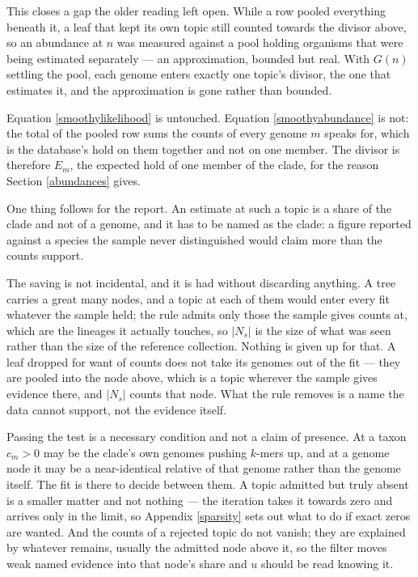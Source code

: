 \documentclass[pdflatex,sn-vancouver-num]{sn-jnl}
\begin{document}
    This closes a gap the older reading left open. While a row pooled everything beneath it, a leaf
    that kept its own topic still counted towards the divisor above, so an abundance at $n$ was
    measured against a pool holding organisms that were being estimated separately --- an
    approximation, bounded but real. With $G(n)$ settling the pool, each genome enters exactly one
    topic's divisor, the one that estimates it, and the approximation is gone rather than
    bounded.

    Equation \eqref{smoothylikelihood} is untouched. Equation \eqref{smoothyabundance} is not:
    the total of the pooled row sums the counts of every genome $m$ speaks for, which
    is the database's hold on them together and not on one member. The divisor is therefore
    $E_m$, the expected hold of one member of the clade, for the reason Section \ref{abundances}
    gives.

    One thing follows for the report. An estimate at such a topic is a share of the clade and not of
    a genome, and it has to be named as the clade: a figure reported against a species the sample
    never distinguished would claim more than the counts support.

    The saving is not incidental, and it is had without discarding anything. A tree carries a great
    many nodes, and a topic at each of them would enter every fit whatever the sample held; the rule
    admits only those the sample gives counts at, which are the lineages it actually touches, so
    $\lvert N_s \rvert$ is the size of what was seen rather than the size of the reference collection.
    Nothing is given up for that. A leaf dropped for want of counts does not take its genomes out of
    the fit --- they are pooled into the node above, which is a topic wherever the sample gives
    evidence there, and $\lvert N_s \rvert$ counts that node. What the rule removes is a name the data
    cannot support, not the evidence itself.

    Passing the test is a necessary condition and not a claim of presence. At a taxon $c_m > 0$ may
    be the clade's own genomes pushing $k$-mers up, and at a genome node it may be a near-identical
    relative of that genome rather than the genome itself. The fit is there to decide between them. A topic admitted but truly absent is a smaller matter
    and not nothing --- the iteration takes it towards zero and arrives only in the limit, so
    Appendix \ref{sparsity} sets out what to do if exact zeros are wanted. And the counts of a
    rejected topic do not vanish; they are explained by whatever remains, usually the admitted node
    above it, so the filter moves weak named evidence into that node's share and $u$ should be read
    knowing it.
\end{document}
